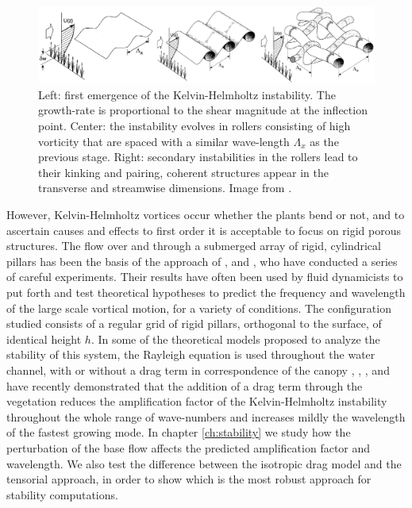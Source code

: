 \begin{figure}[h]
	\centering
	\includegraphics[width=1\linewidth]{chapter_1/finn}
	\caption{Left: first emergence of the Kelvin-Helmholtz instability. The growth-rate is proportional to the shear magnitude at the inflection point. Center: the instability evolves in rollers consisting of high vorticity that are spaced with a similar wave-length $\Lambda_x$ as the previous stage.  Right: secondary instabilities in the rollers lead to their kinking and pairing, coherent structures appear in the transverse and streamwise dimensions. Image from \citet{finnigan2000turbulence}.}
	\label{fig:monai_evol}
\end{figure}


However, Kelvin-Helmholtz vortices occur whether the plants bend or not, and to ascertain causes and effects to first order it is acceptable to focus on rigid porous structures.
The flow over and through a submerged array of rigid, cylindrical pillars has been the basis of the approach of \citet{ghisalberti2002mixing}, \citet{ghisalberti2004limited} and \citet{ghisalberti2005mass}, who have conducted a series of careful experiments. Their results have often been used by fluid dynamicists to put forth and test theoretical hypotheses to predict the frequency and wavelength of the large scale vortical motion, for a variety of conditions.
The configuration studied consists of a regular grid of rigid pillars, orthogonal to the surface, of identical height $h$.
In some of the theoretical models proposed to analyze the stability of this system, the Rayleigh equation is
used throughout the water channel, with or without a drag term in correspondence of the canopy \citet{raupach1996coherent}, \citet{py2004mixing}, \citet{singh2016linear}, \citet{zampogna2016instability} and \citet{luminari2016drag} have recently demonstrated that the addition of a drag term through the vegetation reduces the amplification factor of the Kelvin-Helmholtz instability throughout the whole range of wave-numbers and increases mildly the wavelength of the fastest growing mode.
In chapter \ref{ch:stability} we study how the perturbation of the base flow affects the predicted amplification factor and wavelength. We also test the difference between the isotropic drag model and the tensorial approach, in order to show which is the most robust approach for stability computations.


